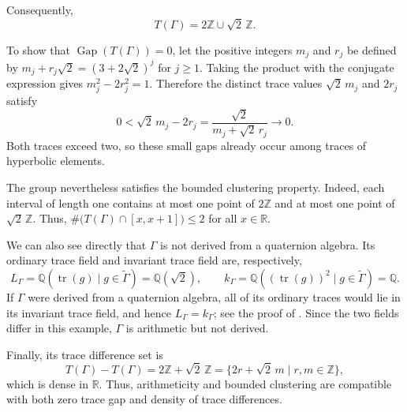 \documentclass[reqno]{amsart}
\theoremstyle{remark}
\DeclareMathOperator{\Gap}{Gap}
\begin{document}
Consequently,
$$
T(\Gamma)=2\mathbb Z\cup\sqrt2\,\mathbb Z.
$$

To show that $\Gap(T(\Gamma))=0$, let the positive integers $m_j$ and $r_j$ be defined by $m_j+r_j\sqrt2=(3+2\sqrt2)^j$ for $j\ge1$. Taking the product with the conjugate expression gives $m_j^2-2r_j^2=1$. Therefore the distinct trace values $\sqrt2\,m_j$ and $2r_j$ satisfy
$$
0<\sqrt2\,m_j-2r_j = \frac{\sqrt2}{m_j+\sqrt2\,r_j}
\longrightarrow0.
$$
Both traces exceed two, so these small gaps already occur among traces of hyperbolic elements.

The group nevertheless satisfies the bounded clustering property. Indeed, each interval of length one contains at most one point of $2\mathbb Z$ and at most one point of $\sqrt2\,\mathbb Z$. Thus, $\#\bigl(T(\Gamma)\cap[x,x+1]\bigr)\le2$ for all $x\in\mathbb R$.


We can also see directly that $\Gamma$ is not derived from a quaternion algebra. Its ordinary trace field and invariant trace field are, respectively,
$$
L_\Gamma =\mathbb Q(\operatorname{tr}(g) \mid g\in\widetilde{\Gamma}) =\mathbb Q(\sqrt2), \qquad k_\Gamma =\mathbb Q((\operatorname{tr}(g))^2 \mid g\in\widetilde{\Gamma}) = \mathbb Q.
$$
If $\Gamma$ were derived from a quaternion algebra, all of its ordinary traces would lie in its invariant trace field, and hence $L_\Gamma=k_\Gamma$; see the proof of \cite[Theorem 4, p.~187]{Vinberg}. Since the two fields differ in this example, $\Gamma$ is arithmetic but not derived.

Finally, its trace difference set is
$$
T(\Gamma)-T(\Gamma)=2\mathbb Z+\sqrt2\,\mathbb Z=\{2r+\sqrt2\,m \mid r,m\in\mathbb Z\},
$$
which is dense in $\mathbb R$. Thus, arithmeticity and bounded clustering are compatible with both zero trace gap and density of trace differences.




\end{document}
